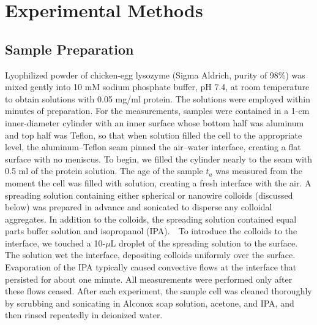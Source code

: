 \section{\label{sec:procedures}Experimental Methods}

\subsection{\label{sec:sample_prep}Sample Preparation}

Lyophilized powder of chicken-egg lysozyme (Sigma Aldrich, purity of 98\%) was mixed gently \cite{Stathopulos2004} into 10 mM sodium phosphate buffer, pH 7.4, at room temperature to obtain solutions with 0.05 mg/ml protein. The solutions were employed within minutes of preparation.
For the measurements, samples were contained in a 1-cm inner-diameter cylinder with an inner surface whose bottom half was aluminum and top half was Teflon, so that when solution filled the cell to the appropriate level, the aluminum--Teflon seam pinned the air--water interface, creating a flat surface with no meniscus.
To begin, we filled the cylinder nearly to the seam with 0.5 ml of the protein solution. The age of the sample $t_a$ was measured from the moment the cell was filled with solution, creating a fresh interface with the air.
A spreading solution containing either spherical or nanowire colloids (discussed below) was prepared in advance and sonicated to disperse any colloidal aggregates. In addition to the colloids, the spreading solution contained equal parts buffer solution and isopropanol (IPA).~~To introduce the colloids to the interface, we touched a 10-$\mu$L droplet of the spreading solution to the surface. The solution wet the interface, depositing colloids uniformly over the surface.   Evaporation of the IPA typically caused convective flows at the interface that persisted for about one minute.  All measurements were performed only after these flows ceased.  After each experiment, the sample cell was cleaned thoroughly by scrubbing and sonicating in Alconox soap solution, acetone, and IPA, and then rinsed repeatedly in deionized water.


